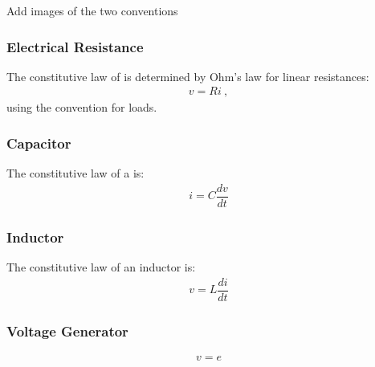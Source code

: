 \documentclass[letterpaper,10pt,english]{jupyterBook}
\begin{document}
\sphinxAtStartPar
{} Add images of the two conventions


\subsubsection{Electrical Resistance}
\label{\detokenize{ch/circuits-electric-components:electrical-resistance}}\label{\detokenize{ch/circuits-electric-components:physics-hs-electromagnetism-circuits-electric-components-resistor}}
\sphinxAtStartPar
The constitutive law of  is determined by Ohm’s law  for linear resistances:
\begin{equation*}
\begin{split}v = R i \ ,\end{split}
\end{equation*}
\sphinxAtStartPar
using the convention for loads.


\subsubsection{Capacitor}
\label{\detokenize{ch/circuits-electric-components:capacitor}}\label{\detokenize{ch/circuits-electric-components:physics-hs-electromagnetism-circuits-electric-components-capacitor}}
\sphinxAtStartPar
The constitutive law of a  is:
\begin{equation*}
\begin{split}i = C \dfrac{d v}{dt}\end{split}
\end{equation*}

\subsubsection{Inductor}
\label{\detokenize{ch/circuits-electric-components:inductor}}\label{\detokenize{ch/circuits-electric-components:physics-hs-electromagnetism-circuits-electric-components-inductor}}
\sphinxAtStartPar
The constitutive law of an inductor is:
\begin{equation*}
\begin{split}v = L \dfrac{d i}{dt}\end{split}
\end{equation*}

\subsubsection{Voltage Generator}
\label{\detokenize{ch/circuits-electric-components:voltage-generator}}\label{\detokenize{ch/circuits-electric-components:physics-hs-electromagnetism-circuits-electric-components-generator-v}}\begin{equation*}
\begin{split}v = e\end{split}
\end{equation*}
\end{document}

